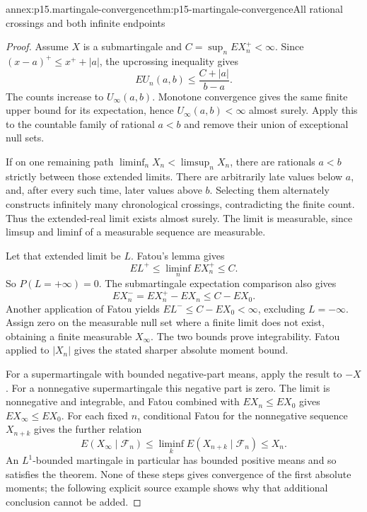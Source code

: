 \begin{annexitem}{annex:p15.martingale-convergence}{thm:p15-martingale-convergence}{All rational crossings and both infinite endpoints}
\begin{proof}
Assume \(X\) is a submartingale and \(C=\sup_nEX_n^+<\infty\).
Since \((x-a)^+\leq x^++|a|\), the upcrossing inequality gives
\[
                         EU_n(a,b)\leq\frac{C+|a|}{b-a}.
\]
The counts increase to \(U_\infty(a,b)\).
Monotone convergence gives the same finite upper bound for its
expectation, hence \(U_\infty(a,b)<\infty\) almost surely.
Apply this to the countable family of rational \(a<b\) and
remove their union of exceptional null sets.

If on one remaining path
\(\liminf_nX_n<\limsup_nX_n\), there are rationals
\(a<b\) strictly between those extended limits.
There are arbitrarily late values below \(a\), and, after every
such time, later values above \(b\).
Selecting them alternately constructs infinitely many chronological
crossings, contradicting the finite count.
Thus the extended-real limit exists almost surely.
The limit is measurable, since limsup and liminf of a measurable
sequence are measurable.

Let that extended limit be \(L\). Fatou's lemma gives
\[
                          EL^+\leq\liminf_nEX_n^+\leq C.
\]
So \(P(L=+\infty)=0\).
The submartingale expectation comparison also gives
\[
                 EX_n^-=EX_n^+-EX_n\leq C-EX_0 .
\]
Another application of Fatou yields
\(EL^-\leq C-EX_0<\infty\), excluding \(L=-\infty\).
Assign zero on the measurable null set where a finite limit
does not exist, obtaining a finite measurable \(X_\infty\).
The two bounds prove integrability.
Fatou applied to \(|X_n|\) gives the stated sharper absolute
moment bound.

For a supermartingale with bounded negative-part means, apply
the result to \(-X\).
For a nonnegative supermartingale this negative part is zero.
The limit is nonnegative and integrable, and Fatou combined
with \(EX_n\leq EX_0\) gives \(EX_\infty\leq EX_0\).
For each fixed \(n\), conditional Fatou for the nonnegative
sequence \(X_{n+k}\) gives the further relation
\[
 E(X_\infty\mid\mathcal F_n)
       \leq\liminf_kE(X_{n+k}\mid\mathcal F_n)\leq X_n.
\]
An \(L^1\)-bounded martingale in particular has bounded positive
means and so satisfies the theorem.
None of these steps gives convergence of the first absolute
moments; the following explicit source example shows why that
additional conclusion cannot be added.
\end{proof}
\end{annexitem}

